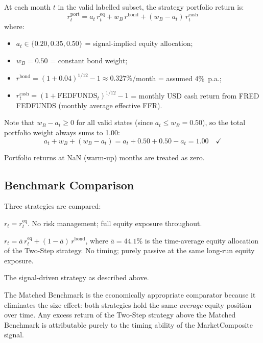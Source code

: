 \documentclass[11pt, a4paper]{article}
\begin{document}
At each month $t$ in the valid labelled subset, the strategy portfolio
return is:
\[
  r_t^{\text{port}} = a_t\, r_t^{\text{eq}}
                    + w_B\, r^{\text{bond}}
                    + (w_B - a_t)\, r_t^{\text{cash}}
\]
where:
\begin{itemize}[leftmargin=2em]
  \item $a_t \in \{0.20, 0.35, 0.50\}$ = signal-implied equity allocation;
  \item $w_B = 0.50$ = constant bond weight;
  \item $r^{\text{bond}} = (1 + 0.04)^{1/12} - 1 \approx 0.327\%$/month = assumed 4\%~p.a.;
  \item $r_t^{\text{cash}} = (1 + \text{FEDFUNDS}_t)^{1/12} - 1$ = monthly USD cash return
        from FRED FEDFUNDS (monthly average effective FFR).
\end{itemize}

Note that $w_B - a_t \geq 0$ for all valid states (since $a_t \leq w_B = 0.50$),
so the total portfolio weight always sums to 1.00:
\[
  a_t + w_B + (w_B - a_t) = a_t + 0.50 + 0.50 - a_t = 1.00\quad\checkmark
\]

Portfolio returns at NaN (warm-up) months are treated as zero.

\subsection{Benchmark Comparison}

Three strategies are compared:

\begin{description}[leftmargin=3em]
  \item[100\% Equities] $r_t = r_t^{\text{eq}}$. No risk management; full
        equity exposure throughout.
  \item[Matched Benchmark] $r_t = \bar{a}\, r_t^{\text{eq}} + (1-\bar{a})\,
        r^{\text{bond}}$, where $\bar{a} = 44.1\%$ is the time-average equity
        allocation of the Two-Step strategy. No timing; purely passive at the
        same long-run equity exposure.
  \item[Two-Step De-Risk] The signal-driven strategy as described above.
\end{description}

The Matched Benchmark is the economically appropriate comparator because
it eliminates the size effect: both strategies hold the same \emph{average}
equity position over time. Any excess return of the Two-Step strategy above
the Matched Benchmark is attributable purely to the timing ability of the
MarketComposite signal.
\end{document}
